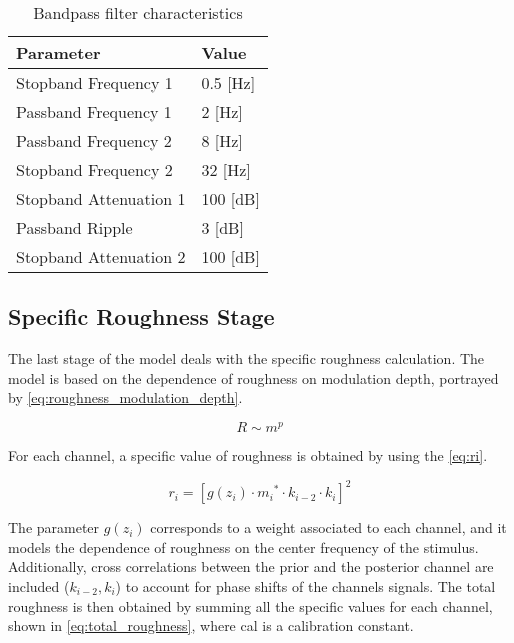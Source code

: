 \documentclass[../main.tex]{subfiles}
\begin{document}
\begin{modelchapter}
\begin{table}[!ht]
  \centering
  \begin{tabu}{l l}
    \toprule
    \rowfont\bfseries
    Parameter & Value \\
    \midrule
    Stopband Frequency 1 & 0.5 [Hz] \\
    \midrule
    Passband Frequency 1 & 2 [Hz] \\
    \midrule
    Passband Frequency 2 & 8 [Hz] \\
    \midrule
    Stopband Frequency 2 & 32 [Hz] \\
    \midrule
    Stopband Attenuation 1 & 100 [dB] \\
    \midrule
    Passband Ripple & 3 [dB] \\
    \midrule
    Stopband Attenuation 2 & 100 [dB] \\
    \bottomrule
  \end{tabu}
  \caption{Bandpass filter characteristics}
  \label{tab:bandpass_filter}
\end{table}

\subsection{Specific Roughness Stage}

The last stage of the model deals with the specific roughness calculation. The
model is based on the dependence of roughness on modulation depth, portrayed
by \cref{eq:roughness_modulation_depth}.

\begin{equation}
  R \sim m^p
  \label{eq:roughness_modulation_depth}
\end{equation}

For each channel, a specific value of roughness is obtained by using the
\cref{eq:ri}.

\begin{equation}
  r_i = [g(z_i) \cdot {m_i}^* \cdot k_{i-2} \cdot k_i]^2
  \label{eq:ri}
\end{equation}

The parameter $g(z_i)$ corresponds to a weight associated to each channel, and
it models the dependence of roughness on the center frequency of the stimulus.
Additionally, cross correlations between the prior and the posterior channel
are included ($k_{i-2}, k_i$) to account for phase shifts of the channels
signals. The total roughness is then obtained by summing all the specific
values for each channel, shown in \cref{eq:total_roughness}, where cal is a
calibration constant.


\end{modelchapter}
\end{document}

